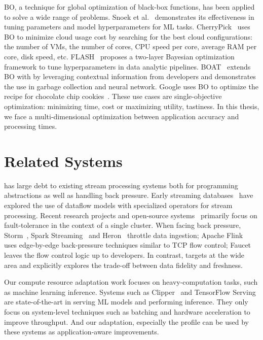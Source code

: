 \documentclass[thesis.tex]{subfiles}
\begin{document}
BO, a technique for global optimization of black-box functions, has been applied
to solve a wide range of problems. Snoek et al.~\cite{snoek2012practical}
demonstrates its effectiveness in tuning parameters and model hyperparameters
for ML tasks. CherryPick~\cite{alipourfard2017cherrypick} uses BO to minimize
cloud usage cost by searching for the best cloud configurations: the number of
VMs, the number of cores, CPU speed per core, average RAM per core, disk speed,
etc. FLASH~\cite{zhang2016flash} proposes a two-layer Bayesian optimization
framework to tune hyperparameters in data analytic
pipelines. BOAT~\cite{dalibard2017boat} extends BO with by leveraging contextual
information from developers and demonstrates the use in garbage collection and
neural network. Google uses BO to optimize the recipe for chocolate chip
cookies~\cite{solnik2017bayesian}. These use cases are single-objective
optimization: minimizing time, cost or maximizing utility, tastiness. In this
thesis, we face a multi-dimensional optimization between application accuracy
and processing times.

\section{Related Systems}
\label{sec:related-systems}

\awstream{} has large debt to existing stream processing systems both for
programming abstractions as well as handling back pressure. Early streaming
databases~\cite{abadi2005design, chandrasekaran2003telegraphcq} have explored
the use of dataflow models with specialized operators for stream
processing. Recent research projects and open-source
systems~\cite{akidau2013millwheel, toshniwal2014storm, sanjeev2015twitter,
  zaharia2013discretized, carbone2015apache} primarily focus on fault-tolerance
in the context of a single cluster. When facing back pressure,
Storm~\cite{toshniwal2014storm}, Spark Streaming~\cite{zaharia2013discretized}
and Heron~\cite{sanjeev2015twitter} throttle data ingestion; Apache
Flink~\cite{carbone2015apache} uses edge-by-edge back-pressure techniques
similar to TCP flow control; Faucet~\cite{lattuada2016faucet} leaves the flow
control logic up to developers. In contrast, \awstream{} targets at the wide
area and explicitly explores the trade-off between data fidelity and freshness.

Our compute resource adaptation work focuses on heavy-computation tasks, such as
machine learning inference. Systems such as Clipper~\cite{crankshaw2017clipper}
and TensorFlow Serving~\cite{tensorflow2017serving} are state-of-the-art in
serving ML models and performing inference. They only focus on system-level
techniques such as batching and hardware acceleration to improve throughput. And
our adaptation, especially the profile can be used by these systems as
application-aware improvements.
\end{document}
